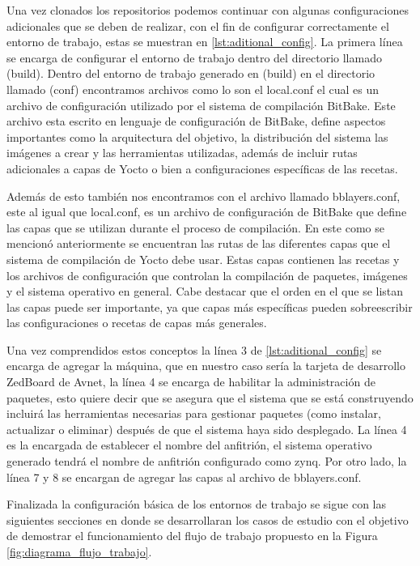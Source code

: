 Una vez clonados los repositorios podemos continuar con algunas configuraciones adicionales que se deben de realizar, con el fin de configurar correctamente el entorno de trabajo, estas se muestran en \ref{lst:aditional_config}. La primera línea se encarga de configurar el entorno de trabajo dentro del directorio llamado (build). Dentro del entorno de trabajo generado en (build) en el directorio llamado (conf) encontramos archivos como lo son el local.conf el cual es un archivo de configuración utilizado por el sistema de compilación BitBake. Este archivo esta escrito en lenguaje de configuración de BitBake, define aspectos importantes como la arquitectura del objetivo, la distribución del sistema las imágenes a crear y las herramientas utilizadas, además de incluir rutas adicionales a capas de Yocto o bien a configuraciones específicas de las recetas. 

Además de esto también nos encontramos con el archivo llamado bblayers.conf, este al igual que local.conf, es un archivo de configuración de BitBake que define las capas que se utilizan durante el proceso de compilación. En este como se mencionó anteriormente se encuentran las rutas de las diferentes capas que el sistema de compilación de Yocto debe usar. Estas capas contienen las recetas y los archivos de configuración que controlan la compilación de paquetes, imágenes y el sistema operativo en general. Cabe destacar que el orden en el que se listan las capas puede ser importante, ya que capas más específicas pueden sobreescribir las configuraciones o recetas de capas más generales.

Una vez comprendidos estos conceptos la línea 3 de \ref{lst:aditional_config} se encarga de agregar la máquina, que en nuestro caso sería la tarjeta de desarrollo ZedBoard de Avnet, la línea 4 se encarga de habilitar la administración de paquetes, esto quiere decir que se asegura que el sistema que se está construyendo incluirá las herramientas necesarias para gestionar paquetes (como instalar, actualizar o eliminar) después de que el sistema haya sido desplegado. La línea 4 es la encargada de establecer el nombre del anfitrión, el sistema operativo generado tendrá el nombre de anfitrión configurado como zynq. Por otro lado, la línea 7 y 8 se encargan de agregar las capas al archivo de bblayers.conf.

Finalizada la configuración básica de los entornos de trabajo se sigue con las siguientes secciones en donde se desarrollaran los casos de estudio con el objetivo de demostrar el funcionamiento del flujo de trabajo propuesto en la Figura \ref{fig:diagrama_flujo_trabajo}.


